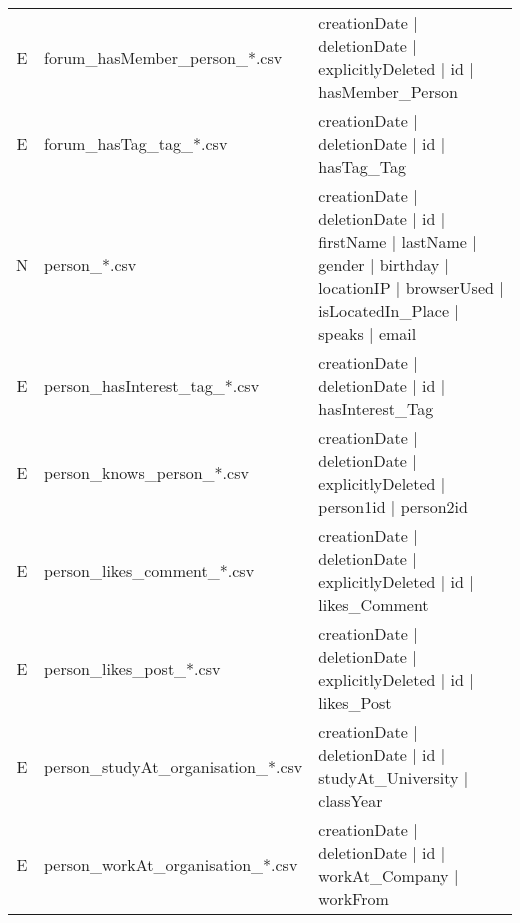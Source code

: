 \begin{table}[htb]
{\begin{tabular}{|c|l|l|}
            E                    & forum\_hasMember\_person\_*.csv      & creationDate | deletionDate | explicitlyDeleted | id | hasMember\_Person                                                                                                                 \\
            E                    & forum\_hasTag\_tag\_*.csv            & creationDate | deletionDate | id | hasTag\_Tag                                                                                                                                           \\
            \hline
            N                    & person\_*.csv                        & creationDate | deletionDate | id | firstName | lastName | gender | birthday | locationIP | browserUsed | isLocatedIn\_Place | speaks | email                                             \\
            E                    & person\_hasInterest\_tag\_*.csv      & creationDate | deletionDate | id | hasInterest\_Tag                                                                                                                                      \\
            E                    & person\_knows\_person\_*.csv         & creationDate | deletionDate | explicitlyDeleted | person1id | person2id                                                                                                                  \\
            E                    & person\_likes\_comment\_*.csv        & creationDate | deletionDate | explicitlyDeleted | id | likes\_Comment                                                                                                                    \\
            E                    & person\_likes\_post\_*.csv           & creationDate | deletionDate | explicitlyDeleted | id | likes\_Post                                                                                                                       \\
            E                    & person\_studyAt\_organisation\_*.csv & creationDate | deletionDate | id | studyAt\_University | classYear                                                                                                                       \\
            E                    & person\_workAt\_organisation\_*.csv  & creationDate | deletionDate | id | workAt\_Company | workFrom                                                                                                                            \\

\end{tabular}}
\end{table}
